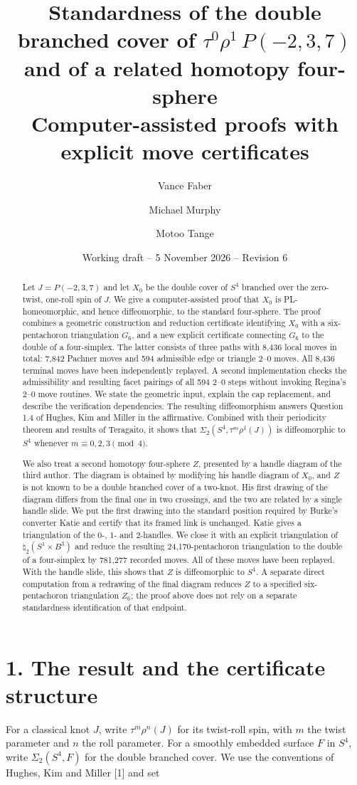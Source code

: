 \documentclass[11pt,letterpaper]{article}
\title{Standardness of the double branched cover of $\tau^0\rho^1\,P(-2,3,7)$\\ and of a related homotopy four-sphere\\[0.4em]\large Computer-assisted proofs with explicit move certificates}
\author{Vance Faber \and Michael Murphy \and Motoo Tange}
\date{Working draft -- 5 November 2026 -- Revision 6}
\begin{document}
\maketitle
\begin{abstract}
Let $J=P(-2,3,7)$ and let $X_0$ be the double cover of $S^4$ branched over the zero-twist, one-roll spin of $J$. We give a computer-assisted proof that $X_0$ is PL-homeomorphic, and hence diffeomorphic, to the standard four-sphere. The proof combines a geometric construction and reduction certificate identifying $X_0$ with a six-pentachoron triangulation $G_6$, and a new explicit certificate connecting $G_6$ to the double of a four-simplex. The latter consists of three paths with 8,436 local moves in total: 7,842 Pachner moves and 594 admissible edge or triangle 2--0 moves. All 8,436 terminal moves have been independently replayed. A second implementation checks the admissibility and resulting facet pairings of all 594 2--0 steps without invoking Regina's 2--0 move routines. We state the geometric input, explain the cap replacement, and describe the verification dependencies. The resulting diffeomorphism answers Question 1.4 of Hughes, Kim and Miller in the affirmative. Combined with their periodicity theorem and results of Teragaito, it shows that $\Sigma_2(S^4,\tau^m\rho^1(J))$ is diffeomorphic to $S^4$ whenever $m\equiv0,2,3\pmod4$.

We also treat a second homotopy four-sphere $Z$, presented by a handle diagram of the third author. The diagram is obtained by modifying his handle diagram of $X_0$, and $Z$ is not known to be a double branched cover of a two-knot. His first drawing of the diagram differs from the final one in two crossings, and the two are related by a single handle slide. We put the first drawing into the standard position required by Burke's converter Katie and certify that its framed link is unchanged. Katie gives a triangulation of the $0$-, $1$- and $2$-handles. We close it with an explicit triangulation of $\natural_2(S^1\times B^3)$ and reduce the resulting 24,170-pentachoron triangulation to the double of a four-simplex by 781,277 recorded moves. All of these moves have been replayed. With the handle slide, this shows that $Z$ is diffeomorphic to $S^4$. A separate direct computation from a redrawing of the final diagram reduces $Z$ to a specified six-pentachoron triangulation $Z_6$; the proof above does not rely on a separate standardness identification of that endpoint.
\end{abstract}
\section*{1. The result and the certificate structure}
For a classical knot $J$, write $\tau^m\rho^n(J)$ for its twist-roll spin, with $m$ the twist parameter and $n$ the roll parameter. For a smoothly embedded surface $F$ in $S^4$, write $\Sigma_2(S^4,F)$ for the double branched cover. We use the conventions of Hughes, Kim and Miller [1] and set
\end{document}

